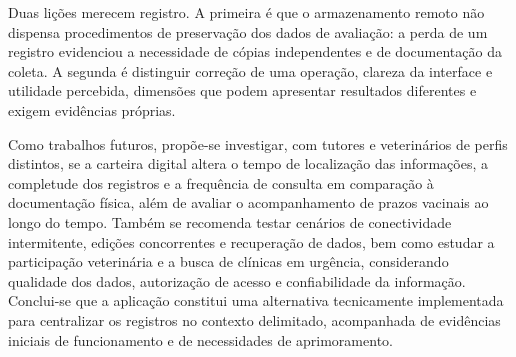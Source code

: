 \documentclass{UNESC}
\begin{document}
Duas lições merecem registro. A primeira é que o armazenamento remoto não dispensa procedimentos de preservação dos dados de avaliação: a perda de um registro evidenciou a necessidade de cópias independentes e de documentação da coleta. A segunda é distinguir correção de uma operação, clareza da interface e utilidade percebida, dimensões que podem apresentar resultados diferentes e exigem evidências próprias.

Como trabalhos futuros, propõe-se investigar, com tutores e veterinários de perfis distintos, se a carteira digital altera o tempo de localização das informações, a completude dos registros e a frequência de consulta em comparação à documentação física, além de avaliar o acompanhamento de prazos vacinais ao longo do tempo. Também se recomenda testar cenários de conectividade intermitente, edições concorrentes e recuperação de dados, bem como estudar a participação veterinária e a busca de clínicas em urgência, considerando qualidade dos dados, autorização de acesso e confiabilidade da informação. Conclui-se que a aplicação constitui uma alternativa tecnicamente implementada para centralizar os registros no contexto delimitado, acompanhada de evidências iniciais de funcionamento e de necessidades de aprimoramento.


\renewcommand{\refname}{REFERÊNCIAS}

\end{document}
